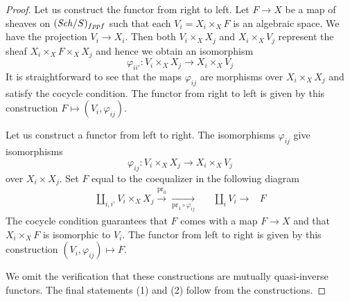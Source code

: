 \begin{proof}
Let us construct the functor from right to left.
Let $F \to X$ be a map of sheaves on $(\mathit{Sch}/S)_{fppf}$ such that each
$V_i = X_i \times_X F$ is an algebraic space. We have the
projection $V_i \to X_i$.
Then both $V_i \times_X X_j$ and $X_i \times_X V_j$
represent the sheaf $X_i \times_X F \times_X X_j$
and hence we obtain an isomorphism
$$
\varphi_{ii'} : V_i \times_X X_j \to X_i \times_X V_j
$$
It is straightforward to see that the maps $\varphi_{ij}$
are morphisms over $X_i \times_X X_j$ and satisfy the
cocycle condition. The functor from right to left is given
by this construction $F \mapsto (V_i, \varphi_{ij})$.

\medskip\noindent
Let us construct a functor from left to right.
The isomorphisms $\varphi_{ij}$ give isomorphisms
$$
\varphi_{ij} : V_i \times_X X_j \longrightarrow X_i \times_X V_j
$$
over $X_i \times X_j$. Set $F$ equal to the coequalizer in the
following diagram
$$
\begin{array}{cccc}\coprod_{i, i'} V_i \times_X X_j
\overset{\text{pr}_0}{\longrightarrow}\underset{\text{pr}_1 \circ \varphi_{ij}}{\longrightarrow} &  & \coprod_i V_i \longrightarrow & F\end{array}
$$
The cocycle condition guarantees that $F$ comes with a map
$F \to X$ and that $X_i \times_X F$ is isomorphic to $V_i$.
The functor from left to right is given
by this construction $(V_i, \varphi_{ij}) \mapsto F$.

\medskip\noindent
We omit the verification that these constructions
are mutually quasi-inverse functors. The final statements
(1) and (2) follow from the constructions.
\end{proof}



